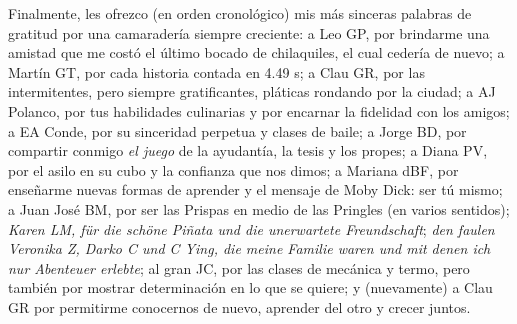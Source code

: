 \begin{acknowledgements}
Finalmente, les ofrezco (en orden cronológico) mis más sinceras palabras de gratitud por una camaradería siempre creciente: a Leo GP, por brindarme una  amistad que me costó el último bocado de chilaquiles, el cual cedería de nuevo; a Martín GT, por cada historia contada en 4.49 s; a Clau GR, por las intermitentes, pero siempre gratificantes, pláticas rondando por la ciudad; a AJ Polanco, por tus habilidades culinarias y por encarnar la fidelidad con los amigos; a EA Conde, por su sinceridad perpetua y clases de baile; a Jorge BD, por compartir conmigo \emph{el juego} de la ayudantía, la tesis y los propes; a Diana PV, por el asilo en su cubo y la confianza que nos dimos; a Mariana dBF, por enseñarme nuevas formas de aprender y el mensaje de Moby Dick: ser tú mismo; a Juan José BM, por ser las Prispas en medio de las Pringles (en varios sentidos); \textit{Karen LM, für die schöne Piñata und die unerwartete Freundschaft}; \textit{den faulen Veronika Z, Darko C und C Ying, die meine Familie waren und mit denen ich nur Abenteuer erlebte}; al gran JC, por las clases de mecánica y termo, pero también por mostrar determinación en lo que se quiere; y (nuevamente) a Clau GR por permitirme conocernos de nuevo, aprender del otro y crecer juntos.













\end{acknowledgements}




